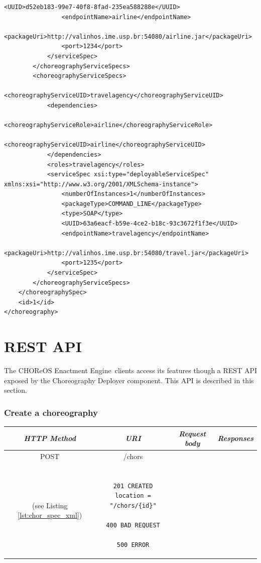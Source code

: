 \documentclass[a4paper, 10pt]{article}
\newcommand{\ee}{CHOReOS Enactment Engine}
\begin{document}
{\begin{lstlisting}[caption=Choreography XML representation example, label=lst:chor_xml]
                <UUID>d52eb183-99e7-40f8-8fad-235ea588288e</UUID>
                <endpointName>airline</endpointName>
                <packageUri>http://valinhos.ime.usp.br:54080/airline.jar</packageUri>
                <port>1234</port>
            </serviceSpec>
        </choreographyServiceSpecs>
        <choreographyServiceSpecs>
            <choreographyServiceUID>travelagency</choreographyServiceUID>
            <dependencies>
                <choreographyServiceRole>airline</choreographyServiceRole>
                <choreographyServiceUID>airline</choreographyServiceUID>
            </dependencies>
            <roles>travelagency</roles>
            <serviceSpec xsi:type="deployableServiceSpec" 
xmlns:xsi="http://www.w3.org/2001/XMLSchema-instance">
                <numberOfInstances>1</numberOfInstances>
                <packageType>COMMAND_LINE</packageType>
                <type>SOAP</type>
                <UUID>63a6eacf-b59e-4ce2-b18c-93c3672f1f3e</UUID>
                <endpointName>travelagency</endpointName>
                <packageUri>http://valinhos.ime.usp.br:54080/travel.jar</packageUri>
                <port>1235</port>
            </serviceSpec>
        </choreographyServiceSpecs>
    </choreographySpec>
    <id>1</id>
</choreography>
\end{lstlisting}

}

\section{REST API}
\label{sec:api}

The \ee\ clients access its features though a REST API exposed by the Choreography Deployer component. This API is described in this section.

\subsubsection*{Create a choreography}

\begin{tabular}{|c|c|c|c|}
\hline 
\itshape{HTTP Method} & \itshape{URI} & \itshape{Request body} & \itshape{Responses} \\ 
\hline 
POST & /chors & 

\begin{minipage}{2in}
\verb!ChorSpec! XML representation \\ 
(see Listing \ref{lst:chor_spec_xml})
\end{minipage} 
&

\begin{minipage}{2in}
\begin{verbatim}

201 CREATED
location = "/chors/{id}"

400 BAD REQUEST

500 ERROR

\end{verbatim}
\end{minipage} 
\\ 
\hline 
\end{tabular} \\
\end{document}
